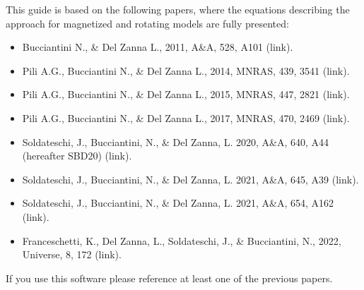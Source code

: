 \documentclass[letterpaper,10pt,english]{sphinxmanual}
\begin{document}
\sphinxAtStartPar
This guide is based on the following papers, where the equations describing the approach for magnetized and rotating models are fully presented:
\begin{itemize}
\item {} 
\sphinxAtStartPar
Bucciantini N., \& Del Zanna L., 2011, A\&A, 528, A101 (link).

\item {} 
\sphinxAtStartPar
Pili A.G., Bucciantini N., \& Del Zanna L., 2014, MNRAS, 439, 3541 (link).

\item {} 
\sphinxAtStartPar
Pili A.G., Bucciantini N., \& Del Zanna L., 2015, MNRAS, 447, 2821 (link).

\item {} 
\sphinxAtStartPar
Pili A.G., Bucciantini N., \& Del Zanna L., 2017, MNRAS, 470, 2469 (link).

\item {} 
\sphinxAtStartPar
Soldateschi, J., Bucciantini, N., \& Del Zanna, L. 2020, A\&A, 640, A44 (hereafter SBD20) (link).

\item {} 
\sphinxAtStartPar
Soldateschi, J., Bucciantini, N., \& Del Zanna, L. 2021, A\&A, 645, A39 (link).

\item {} 
\sphinxAtStartPar
Soldateschi, J., Bucciantini, N., \& Del Zanna, L. 2021, A\&A, 654, A162 (link).

\item {} 
\sphinxAtStartPar
Franceschetti, K., Del Zanna, L., Soldateschi, J., \& Bucciantini, N., 2022, Universe, 8, 172 (link).

\end{itemize}

\sphinxAtStartPar
If you use this software please reference at least one of the previous papers.

\sphinxstepscope
\end{document}
